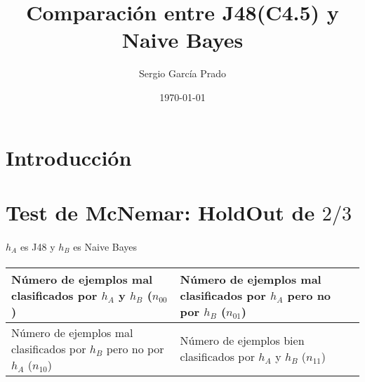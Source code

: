 \documentclass[10pt, a4paper,spanish]{article}
\title{\vspace{-15mm}\fontsize{24pt}{10pt}\selectfont\textbf{Comparación entre J48(C4.5) y Naive Bayes}} %
\author{Sergio García Prado}
\date{\today}
\begin{document}
	\maketitle %

	\thispagestyle{fancy} %


	\begin{abstract}
		\noindent
	\end{abstract}


	\section{Introducción}
        \paragraph{}


	\section{Test de McNemar: HoldOut de $2/3$}

        \paragraph{}
		$h_A$ es J48 y $h_B$ es Naive Bayes

		\paragraph{}
		\begin{center}
			\begin{tabular}{ | p{6cm} | p{6cm} | }
				\hline
					Número de ejemplos mal clasificados por $h_A$  y $h_B$ ($n_{00}$) &
					Número de ejemplos mal clasificados por $h_A$  pero no por $h_B$ ($n_{01}$) \\ \hline

					Número de ejemplos mal clasificados por $h_B$ pero no por $h_A$ ($n_{10}$) &
					Número de ejemplos bien clasificados por $h_A$  y $h_B$ ($n_{11}$)\\
				\hline
			\end{tabular}
		\end{center}
\end{document}

